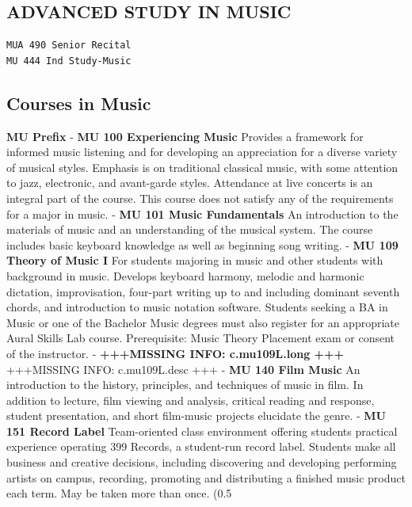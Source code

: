 \documentclass[
  letterpaper,
]{scrbook}
\begin{document}
\hypertarget{advanced-study-in-music}{%
\subsection{ADVANCED STUDY IN MUSIC}\label{advanced-study-in-music}}

\begin{verbatim}
MUA 490 Senior Recital
MU 444 Ind Study-Music
\end{verbatim}

\hypertarget{courses-in-music}{%
\subsection{Courses in Music}\label{courses-in-music}}

\textbf{MU Prefix} - \textbf{MU 100 Experiencing Music} Provides a
framework for informed music listening and for developing an
appreciation for a diverse variety of musical styles. Emphasis is on
traditional classical music, with some attention to jazz, electronic,
and avant-garde styles. Attendance at live concerts is an integral part
of the course. This course does not satisfy any of the requirements for
a major in music. - \textbf{MU 101 Music Fundamentals} An introduction
to the materials of music and an understanding of the musical system.
The course includes basic keyboard knowledge as well as beginning song
writing. - \textbf{MU 109 Theory of Music I} For students majoring in
music and other students with background in music. Develops keyboard
harmony, melodic and harmonic dictation, improvisation, four-part
writing up to and including dominant seventh chords, and introduction to
music notation software. Students seeking a BA in Music or one of the
Bachelor Music degrees must also register for an appropriate Aural
Skills Lab course. Prerequisite: Music Theory Placement exam or consent
of the instructor. - \textbf{+++MISSING INFO: c.mu109L.long +++}
+++MISSING INFO: c.mu109L.desc +++ - \textbf{MU 140 Film Music} An
introduction to the history, principles, and techniques of music in
film. In addition to lecture, film viewing and analysis, critical
reading and response, student presentation, and short film-music
projects elucidate the genre. - \textbf{MU 151 Record Label}
Team-oriented class environment offering students practical experience
operating 399 Records, a student-run record label. Students make all
business and creative decisions, including discovering and developing
performing artists on campus, recording, promoting and distributing a
finished music product each term. May be taken more than once. (0.5
\end{document}
